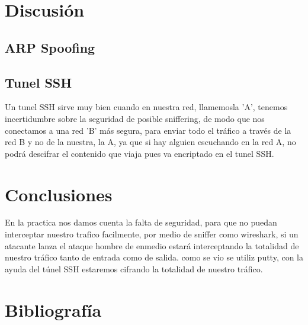 \documentclass{article}
\begin{document}
\section{Discusi\'on}

\subsection{ARP Spoofing}

\subsection{Tunel SSH}

Un tunel SSH sirve muy bien cuando en nuestra red, llamemosla 'A', tenemos incertidumbre sobre la seguridad de posible sniffering, de modo que nos conectamos a una red 'B' m\'as segura, para enviar todo el tr\'afico a trav\'es de la red B y no de la nuestra, la A, ya que si hay alguien escuchando en la red A, no podr\'a descifrar el contenido que viaja pues va encriptado en el tunel SSH.

\section{Conclusiones}
En la practica nos damos cuenta la falta de seguridad, para que no puedan interceptar nuestro trafico facilmente, por medio de sniffer como wireshark, 
si un atacante lanza el ataque hombre de enmedio estará interceptando la totalidad de nuestro tráfico tanto de entrada como de salida. como se vio se utiliz putty, con la ayuda del túnel SSH estaremos cifrando la totalidad de nuestro tráfico.

\section{Bibliograf\'ia}
\end{document}
